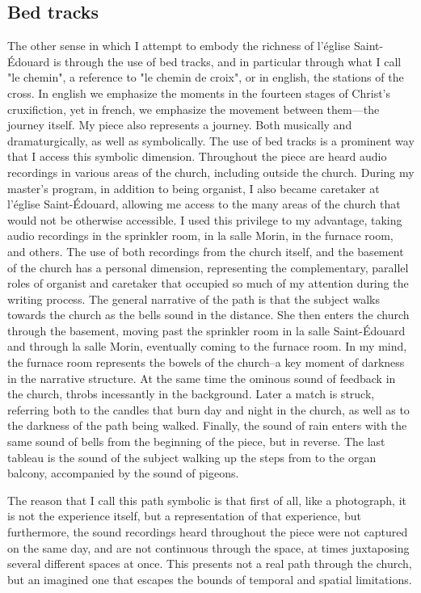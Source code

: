 \documentclass[12pt,twoside,maitrise]{dms_ks}
\theoremstyle{definition}
\begin{document}
\subsection{Bed tracks}

The other sense in which I attempt to embody the richness of l'église Saint-Édouard is through the use of bed tracks, and in particular through what I call "le chemin", a reference to "le chemin de croix", or in english, the stations of the cross. In english we emphasize the moments in the fourteen stages of Christ's cruxifiction, yet in french, we emphasize the movement between them---the journey itself. My piece also represents a journey. Both musically and dramaturgically, as well as symbolically. The use of bed tracks is a prominent way that I access this symbolic dimension. Throughout the piece are heard audio recordings in various areas of the church, including outside the church. During my master's program, in addition to being organist, I also became caretaker at l'église Saint-Édouard, allowing me access to the many areas of the church that would not be otherwise accessible. I used this privilege to my advantage, taking audio recordings in the sprinkler room, in la salle Morin, in the furnace room, and others. The use of both recordings from the church itself, and the basement of the church has a personal dimension, representing the complementary, parallel roles of organist and caretaker that occupied so much of my attention during the writing process. The general narrative of the path is that the subject walks towards the church as the bells sound in the distance. She then enters the church through the basement, moving past the sprinkler room in la salle Saint-Édouard and through la salle Morin, eventually coming to the furnace room. In my mind, the furnace room represents the bowels of the church–a key moment of darkness in the narrative structure. At the same time the ominous sound of feedback in the church, throbs incessantly in the background. Later a match is struck, referring both to the candles that burn day and night in the church, as well as to the darkness of the path being walked. Finally, the sound of rain enters with the same sound of bells from the beginning of the piece, but in reverse. The last tableau is the sound of the subject walking up the steps from to the organ balcony, accompanied by the sound of pigeons.

The reason that I call this path symbolic is that first of all, like a photograph, it is not the experience itself, but a representation of that experience, but furthermore, the sound recordings heard throughout the piece were not captured on the same day, and are not continuous through the space, at times juxtaposing several different spaces at once. This presents not a real path through the church, but an imagined one that escapes the bounds of temporal and spatial limitations.
\end{document}
